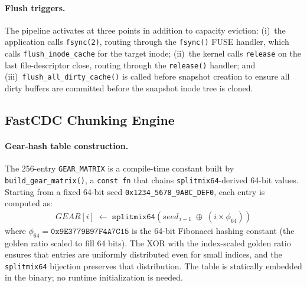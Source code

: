\documentclass[journal]{IEEEtran}
\begin{document}
\paragraph{Flush triggers.}
The pipeline activates at three points in addition to capacity eviction:
(i)~the application calls \texttt{fsync(2)}, routing through the
\texttt{fsync()} FUSE handler, which calls \texttt{flush\_inode\_cache}
for the target inode; (ii)~the kernel calls \texttt{release} on the
last file-descriptor close, routing through the \texttt{release()} handler;
and (iii)~\texttt{flush\_all\_dirty\_cache()} is called before snapshot
creation to ensure all dirty buffers are committed before the snapshot
inode tree is cloned.

\subsection{FastCDC Chunking Engine}
\label{sec:cdc}

\paragraph{Gear-hash table construction.}
The 256-entry \texttt{GEAR\_MATRIX} is a compile-time constant built by
\texttt{build\_gear\_matrix()}, a \texttt{const fn} that chains
\texttt{splitmix64}-derived 64-bit values.  Starting from a fixed 64-bit
seed \texttt{0x1234\_5678\_9ABC\_DEF0}, each entry is computed as:
\begin{align}
  \mathit{GEAR}[i] \;\leftarrow\;
    \texttt{splitmix64}\!\left(\mathit{seed}_{\,i-1}
      \;\oplus\;
      (i \times \phi_{64})\right)
  \label{eq:gear_matrix}
\end{align}
where $\phi_{64} = \texttt{0x9E3779B97F4A7C15}$ is the 64-bit
Fibonacci hashing constant (the golden ratio scaled to fill 64 bits).  The XOR with the
index-scaled golden ratio ensures that entries are uniformly distributed
even for small indices, and the \texttt{splitmix64} bijection preserves
that distribution.  The table is statically embedded in the binary;
no runtime initialization is needed.
\end{document}
